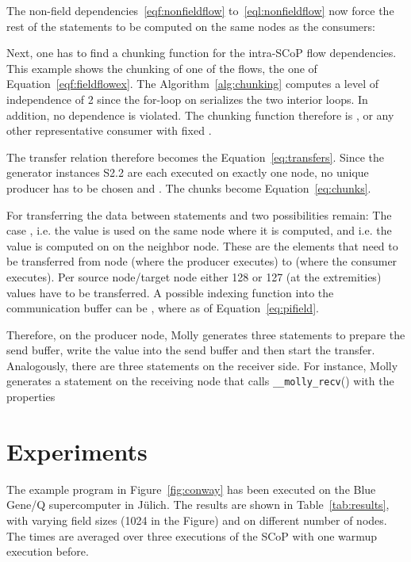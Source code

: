 \documentclass{sigplanconf}
\begin{document}
The non-field dependencies~\ref{eqf:nonfieldflow} to~\ref{eql:nonfieldflow} now force the rest of the statements to be computed on the same nodes as the consumers:



Next, one has to find a chunking function for the intra-SCoP flow dependencies. This example shows the chunking of one of the flows, the one of Equation~\ref{eqf:fieldflowex}. The Algorithm~\ref{alg:chunking} computes a level of independence of 2 since the for-loop on  serializes the two interior loops. In addition, no dependence is violated. The chunking function therefore is , or any other representative consumer with fixed .

The transfer relation therefore becomes the Equation~\ref{eq:transfers}. Since the generator instances S2.2 are each executed on exactly one node, no unique producer has to be chosen and . The chunks become Equation~\ref{eq:chunks}.

\begin{figure*}

\end{figure*}




For transferring the data between statements  and  two possibilities remain: The case , i.e. the value is used on the same node where it is computed, and  i.e. the value is computed on on the neighbor node. These are the elements  that need to be transferred from node  (where the producer executes) to  (where the consumer executes). Per source node/target node either 128 or 127 (at the extremities) values have to be transferred. A possible indexing function into the communication buffer can be , where  as of Equation~\ref{eq:pifield}.

Therefore, on the producer node, Molly generates three statements to prepare the send buffer, write the value into the send buffer and then start the transfer. Analogously, there are three statements on the receiver side. For instance, Molly generates a statement  on the receiving node  that calls \texttt{\_\_molly\_recv}() with the properties




\section{Experiments}\label{sct:experiments}

The example program in Figure~\ref{fig:conway} has been executed on the Blue Gene/Q supercomputer in Jülich. The results are shown in Table~\ref{tab:results}, with varying field sizes (1024 in the Figure) and on different number of nodes. The times are averaged over three executions of the SCoP with one warmup execution before.
\end{document}
